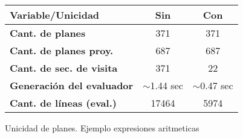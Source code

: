 \begin{figure}[h!]
    \begin{center}
        \setlength{\doublerulesep}{0mm}
        \setlength{\arrayrulewidth}{0.9pt}
        \begin{tabular}{|l||c|c|}
            \hline
            \rowcolor{gris} \textbf{Variable/Unicidad}&\textbf{Sin} & \textbf{Con} \\ \hline
            \rowcolor{white}\textbf{Cant. de planes}           & 371                        & 371                         \\ \hline
            \rowcolor{white}\textbf{Cant. de planes proy.}     & 687                        & 687                         \\ \hline
            \rowcolor{white}\textbf{Cant. de sec. de visita }  & \color{red}371             & \color{blue}22              \\ \hline
            \rowcolor{white}\textbf{Generación del evaluador}  & \color{red} $\sim$1.44 sec & \color{blue} $\sim$0.47 sec \\ \hline
            \rowcolor{white}\textbf{Cant. de líneas (eval.)}   & \color{red}17464           & \color{blue}5974            \\ \hline
        \end{tabular}
    \end{center}
    \caption{\label{fig:uni_plan}Unicidad de planes. Ejemplo expresiones aritmeticas}
\end{figure}